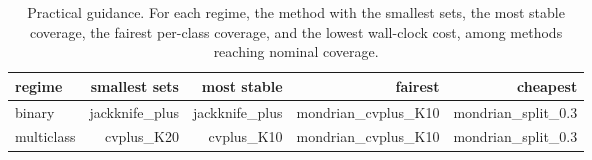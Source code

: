 \begin{table}[t]
\centering
\small
\caption{Practical guidance. For each regime, the method with the smallest sets, the most stable coverage, the fairest per-class coverage, and the lowest wall-clock cost, among methods reaching nominal coverage.}
\label{tab:guidelines}
\begin{tabular}{lrrrr}
\toprule
regime & smallest sets & most stable & fairest & cheapest \\
\midrule
binary & jackknife\_plus & jackknife\_plus & mondrian\_cvplus\_K10 & mondrian\_split\_0.3 \\
multiclass & cvplus\_K20 & cvplus\_K10 & mondrian\_cvplus\_K10 & mondrian\_split\_0.3 \\
\bottomrule
\end{tabular}
\end{table}
